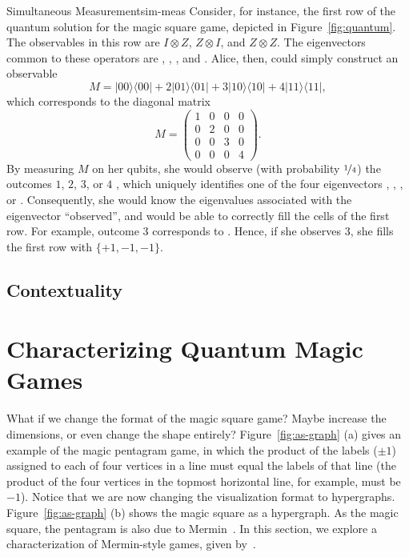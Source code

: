\documentclass{llncs}
\newcommand{\ketbra}[2]{\ensuremath{| #1 \rangle \langle #2 |}}
\begin{document}
\begin{tcbexample}{Simultaneous Measurement}{sim-meas}
  Consider, for instance, the first row of the quantum solution for
  the magic square game, depicted in Figure~\ref{fig:quantum}. The
  observables in this row are \(I \otimes Z\), \(Z \otimes I\), and
  \(Z \otimes Z\). The eigenvectors common to these operators are
  , , , and . Alice, then, could
  simply construct an observable
  \[M = \ketbra{00}{00} + 2 \ketbra{01}{01} + 3 \ketbra{10}{10} + 4
    \ketbra{11}{11},\] which corresponds to the diagonal matrix
  \begin{equation*}
    M = \begin{pmatrix}
          1 & 0 & 0 & 0 \\
          0 & 2 & 0 & 0 \\
          0 & 0 & 3 & 0 \\
          0 & 0 & 0 & 4
    \end{pmatrix}.
  \end{equation*}
  By measuring \(M\) on her qubits, she would observe (with
  probability \(\nicefrac{1}{4}\)) the outcomes \(1\), \(2\), \(3\), or
  \(4\) , which uniquely identifies one of the four eigenvectors
  , , , or . Consequently, she would
  know the eigenvalues associated with the eigenvector ``observed'',
  and would be able to correctly fill the cells of the first row. For
  example, outcome \(3\) corresponds to . Hence, if she
  observes \(3\), she fills the first row with \(\{+1, -1, -1\}\).
\end{tcbexample}

\subsection{Contextuality}
\label{sec:context}

\section{Characterizing Quantum Magic Games}
\label{sec:extending}
What if we change the format of the magic square game?  Maybe increase
the dimensions, or even change the shape entirely?
Figure~\ref{fig:as-graph} (a) gives an example of the magic pentagram
game, in which the product of the labels (\(\pm{}1\)) assigned to each
of four vertices in a line must equal the labels of that line (the
product of the four vertices in the topmost horizontal line, for
example, must be \(-1\)). Notice that we are now changing the
visualization format to hypergraphs.  Figure~\ref{fig:as-graph} (b)
shows the magic square as a hypergraph.  As the magic square, the
pentagram is also due to Mermin~\cite{mermin:1993}.  In this section,
we explore a characterization of Mermin-style games, given
by~\cite{arkhipov:2012}.
\end{document}
